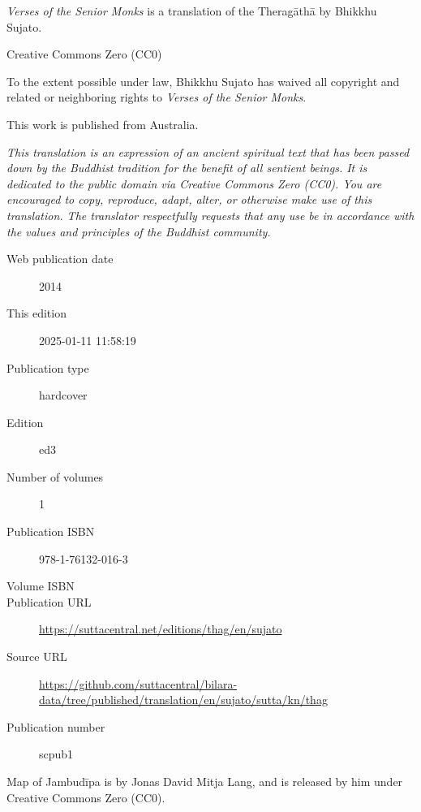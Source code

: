 \documentclass[12pt,openany]{book}%
\begin{document}
\begin{footnotesize}

\textit{Verses of the Senior Monks} is a translation of the Theragāthā by Bhikkhu Sujato.

\medskip

Creative Commons Zero (CC0)

To the extent possible under law, Bhikkhu Sujato has waived all copyright and related or neighboring rights to \textit{Verses of the Senior Monks}.

\medskip

This work is published from Australia.

\begin{center}
\textit{This translation is an expression of an ancient spiritual text that has been passed down by the Buddhist tradition for the benefit of all sentient beings. It is dedicated to the public domain via Creative Commons Zero (CC0). You are encouraged to copy, reproduce, adapt, alter, or otherwise make use of this translation. The translator respectfully requests that any use be in accordance with the values and principles of the Buddhist community.}
\end{center}

\medskip

\begin{description}
    \item[Web publication date] 2014
    \item[This edition] 2025-01-11 11:58:19
    \item[Publication type] hardcover
    \item[Edition] ed3
    \item[Number of volumes] 1
    \item[Publication ISBN] 978-1-76132-016-3
    \item[Volume ISBN] 
    \item[Publication URL] \href{https://suttacentral.net/editions/thag/en/sujato}{https://suttacentral.net/editions/thag/en/sujato}
    \item[Source URL] \href{https://github.com/suttacentral/bilara-data/tree/published/translation/en/sujato/sutta/kn/thag}{https://github.com/suttacentral/bilara-data/tree/published/translation/en/sujato/sutta/kn/thag}
    \item[Publication number] scpub1
\end{description}

\medskip

Map of Jambudīpa is by Jonas David Mitja Lang, and is released by him under Creative Commons Zero (CC0).


\end{footnotesize}
\end{document}
